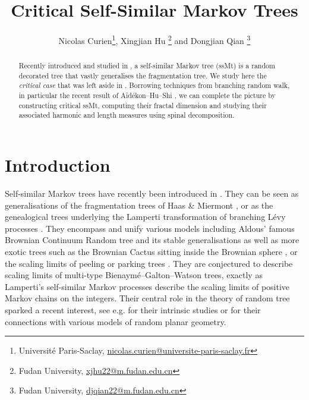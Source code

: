 \documentclass[12pt]{article}
\title{Critical Self-Similar Markov Trees}
\author{Nicolas Curien\thanks{Universit\'e Paris-Saclay, \url{nicolas.curien@universite-paris-saclay.fr}},   Xingjian Hu \thanks{Fudan University, \url{xjhu22@m.fudan.edu.cn}} and  Dongjian Qian \thanks{Fudan University, \url{djqian22@m.fudan.edu.cn}}}
\date{}
\numberwithin{equation}{section}
\theoremstyle{plain}
\theoremstyle{definition}
\begin{document}
\maketitle

\begin{abstract}
Recently introduced and studied in \cite{BertoinJean2024SMta}, a self-similar Markov tree (ssMt) is a random decorated tree that vastly generalises the fragmentation tree. We study here the \emph{critical case} that was left aside in \cite{BertoinJean2024SMta}. Borrowing techniques from branching random walk, in particular the recent result of Aïdékon--Hu--Shi \cite{AidekonElie2024Bodt}, we can complete the picture by constructing critical ssMt, computing their fractal dimension and studying their associated harmonic and length measures using spinal decomposition.
\end{abstract}


\section{Introduction}
Self-similar Markov trees have  recently been introduced in \cite{BertoinJean2024SMta}. They can be seen as generalisations of the fragmentation trees of Haas \& Miermont \cite{HaasBenedicte2004TGoS}, or as the genealogical trees underlying the Lamperti transformation of branching L\'evy processes \cite{BertoinJean2019IRPM}. They encompass and unify various models including  Aldous' famous Brownian Continuum Random tree \cite{AldousDavid1991TCRT} and its stable generalisations \cite{DuquesneThomas2002RtLp} as well as more exotic trees such as the Brownian Cactus \cite{CurienNicolas2013TBcI} sitting inside the Brownian sphere \cite{LeGallJean-Francois2020GPIB, bertoin2018random}, or the scaling limits of peeling or parking trees \cite{BertoinJean2018Misg,contat2025universality}. They are conjectured to describe scaling limits of multi-type Bienaym\'e--Galton--Watson trees, exactly as Lamperti's self-similar Markov processes describe the scaling limits of positive Markov chains on the integers. Their central role in the theory of random tree sparked a recent interest, see e.g. \cite{bertoin2026local, curien2025growing} for their intrinsic studies or \cite{aidekon2022growth, LeGallJean-Francois2020GPIB, bertoin2018random, DaSilvaWilliam2025GBce} for their connections with various models of random planar geometry.
\end{document}
